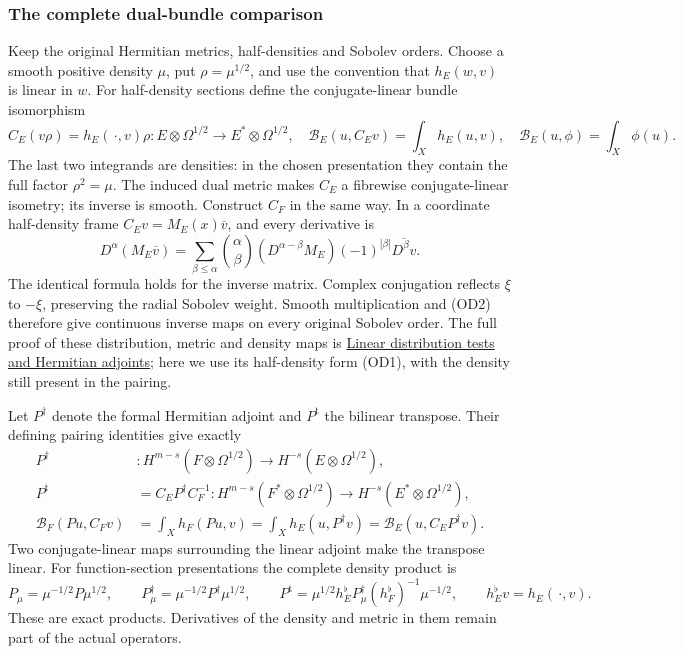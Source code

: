 \documentclass[
  11pt,
]{article}
\makeatletter
\let\ReaderOriginalAnchorStart\hyper@anchorstart
\let\ReaderOriginalAnchorEnd\hyper@anchorend
\let\ReaderPendingAliases\@empty
\def\ReaderArmAliases#1{\gdef\ReaderPendingAliases{#1}}
\def\hyper@anchorstart#1{\ReaderIfNativeAnchorTF{#1}{\ReaderPendingAliases\global\let\ReaderPendingAliases\@empty}{}\ReaderOriginalAnchorStart{#1}}
\makeatother
\begin{document}
\ReaderArmAliases{\ReaderOriginalAnchorStart{the-complete-dual-bundle-comparison}\ReaderOriginalAnchorEnd}
\subsubsection{The complete dual-bundle
comparison}\label{the-complete-dual-bundle-comparison}

Keep the original Hermitian metrics, half-densities and Sobolev orders.
Choose a smooth positive density \(\mu\), put \(\rho=\mu^{1/2}\), and
use the convention that \(h_E(w,v)\) is linear in \(w\). For
half-density sections define the conjugate-linear bundle isomorphism \[
 C_E(v\rho)=h_E(\,\cdot,v)\rho:
       E\otimes\Omega^{1/2}\longrightarrow E^*\otimes\Omega^{1/2},
 \quad
 \mathcal B_E(u,C_Ev)=\int_Xh_E(u,v),
 \quad
 \mathcal B_E(u,\phi)=\int_X\phi(u).
 \tag{OD1}
\] The last two integrands are densities: in the chosen presentation
they contain the full factor \(\rho^2=\mu\). The induced dual metric
makes \(C_E\) a fibrewise conjugate-linear isometry; its inverse is
smooth. Construct \(C_F\) in the same way. In a coordinate half-density
frame \(C_Ev=M_E(x)\overline v\), and every derivative is \[
 D^\alpha(M_E\overline v)
  =\sum_{\beta\leq\alpha}\binom{\alpha}{\beta}
       (D^{\alpha-\beta}M_E)(-1)^{|\beta|}
                          \overline{D^\beta v}.
 \tag{OD2}
\] The identical formula holds for the inverse matrix. Complex
conjugation reflects \(\xi\) to \(-\xi\), preserving the radial Sobolev
weight. Smooth multiplication and (OD2) therefore give continuous
inverse maps on every original Sobolev order. The full proof of these
distribution, metric and density maps is
\href{global-boundary-calculus.pdf}{Linear
distribution tests and Hermitian adjoints}; here we use its half-density
form (OD1), with the density still present in the pairing.

Let \(P^\dagger\) denote the formal Hermitian adjoint and
\(P^{\mathrm t}\) the bilinear transpose. Their defining pairing
identities give exactly \[
 \begin{aligned}
 P^\dagger&:H^{m-s}(F\otimes\Omega^{1/2})
                          \longrightarrow H^{-s}(E\otimes\Omega^{1/2}),\\
 P^{\mathrm t}&=C_E P^\dagger C_F^{-1}:
  H^{m-s}(F^*\otimes\Omega^{1/2})
                          \longrightarrow H^{-s}(E^*\otimes\Omega^{1/2}),\\
 \mathcal B_F(Pu,C_Fv)
   &=\int_Xh_F(Pu,v)
     =\int_Xh_E(u,P^\dagger v)
     =\mathcal B_E(u,C_E P^\dagger v).
 \end{aligned}
 \tag{OD3}
\] Two conjugate-linear maps surrounding the linear adjoint make the
transpose linear. For function-section presentations the complete
density product is \[
 P_\mu=\mu^{-1/2}P\mu^{1/2},\qquad
 P^\dagger_\mu=\mu^{-1/2}P^\dagger\mu^{1/2},\qquad
 P^{\mathrm t}
  =\mu^{1/2}h_E^\flat P^\dagger_\mu
                     (h_F^\flat)^{-1}\mu^{-1/2},
 \qquad h_E^\flat v=h_E(\,\cdot,v).
 \tag{OD4}
\] These are exact products. Derivatives of the density and metric in
them remain part of the actual operators.
\end{document}
